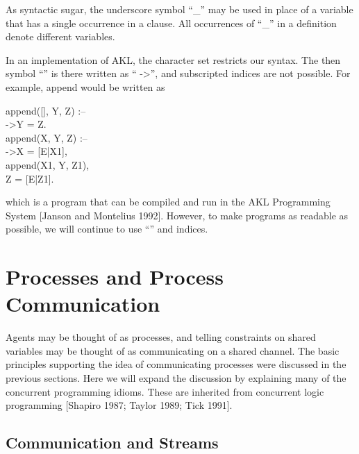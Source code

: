 As syntactic sugar, the underscore symbol ``{\prog _}'' may be used in
place of a variable that has a single occurrence in a clause.  All
occurrences of ``{\prog _}'' in a definition denote different
variables.

In an implementation of AKL, the character set restricts our
syntax.  The then symbol ``{\prog \cond}'' is there written as ``{\prog
->}'', and subscripted indices are not possible.  For example, append
would be written as
%
\begin{program}
append([], Y, Z) :-- \\
\>->\>Y = Z.  \\
append(X, Y, Z) :-- \\
\>->\>X = [E|X1], \\
\>  \>append(X1, Y, Z1), \\
\>  \>Z = [E|Z1].
\end{program}%
%
which is a program that can be compiled and run in the AKL Programming
System [Janson and Montelius 1992].  However, to make programs as
readable as possible, we will continue to use ``{\prog \cond}'' and
indices.


\section{Processes and Process Communication}

Agents may be thought of as processes, and telling constraints on
shared variables may be thought of as communicating on a shared
channel.  The basic principles supporting the idea of communicating
processes were discussed in the previous sections.  Here we will
expand the discussion by explaining many of the concurrent programming
idioms.  These are inherited from concurrent logic programming [Shapiro
1987; Taylor 1989; Tick 1991].

\subsection{Communication and Streams}

